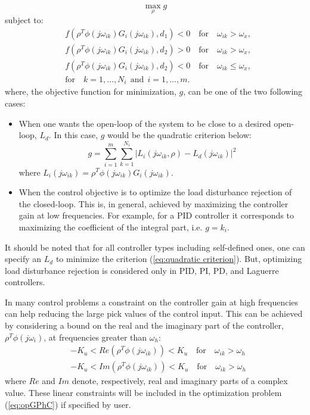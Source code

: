 \documentclass [12pt , a4paper] {report}
\begin{document}
\newpage
 \[
\max_\rho{g}
\]
subject to:
\begin{align}
\label{eq:opGPhC}
& f(\rho^T \phi(j\omega_{ik})G_i(j\omega_{ik}),d_1)<0 \quad \mbox{for} \quad \omega_{ik}>\omega_x, \nonumber \\
& f(\rho^T \phi(j\omega_{ik})G_i(j\omega_{ik}),d_2)>0 \quad \mbox{for} \quad \omega_{ik}>\omega_x,  \\
& f(\rho^T \phi(j\omega_{ik})G_i(j\omega_{ik}),d_2)<0 \quad \mbox{for} \quad \omega_{ik} \leqslant \omega_x, \nonumber \\
& \mbox{for} \quad k=1,\ldots,N_i \:\: \mbox{and} \:\: i=1,\ldots,m. \nonumber
\end{align}
where, the objective function for minimization, $g$, can be one of the two following cases:
\begin{itemize}
\item When one wants the open-loop of the system to be close to a desired open-loop, $L_d$. In this case, $g$ would be the quadratic criterion below:
\begin{equation}
g=\sum_{i=1}^{m}\sum_{k=1}^{N_i} |L_i(j\omega_{ik},\rho)-L_d(j\omega_{ik})|^2
\label{eq:quadratic criterion}
\end{equation}
where $L_i(j\omega_{ik})=\rho^T \phi(j\omega_{ik})G_i(j\omega_{ik})$.

\item When the control objective is to optimize the load disturbance rejection of the closed-loop. This is, in general, achieved by maximizing the controller gain at low frequencies. For example, for a PID controller it corresponds to maximizing the coefficient of the integral part, i.e. $g = k_i$.
\end{itemize}

It should be noted that for all controller types including self-defined ones, one can specify an $L_d$ to minimize the criterion (\ref{eq:quadratic criterion}). But, optimizing load disturbance rejection is considered only in PID, PI, PD, and Laguerre controllers.

In many control problems a constraint on the controller gain at high frequencies can help reducing the large pick values of the control input. This can be achieved by considering a bound on the real and the imaginary part of the controller, $\rho^T\phi(j\omega_{i})$, at frequencies greater than $\omega_h$:
\begin{align}
& -K_u<Re(\rho^T \phi(j\omega_{ik}))<K_u \quad \mbox{for} \quad \omega_{ik} > \omega_h \nonumber \\
& -K_u<Im(\rho^T \phi(j\omega_{ik}))<K_u \quad \mbox{for} \quad \omega_{ik} > \omega_h 
\label{eq:Kuwh}
\end{align} 
where $Re$ and $Im$ denote, respectively, real and imaginary parts of a complex value. These linear constraints will be included in the optimization problem (\ref{eq:opGPhC}) if specified by user.
\end{document}
